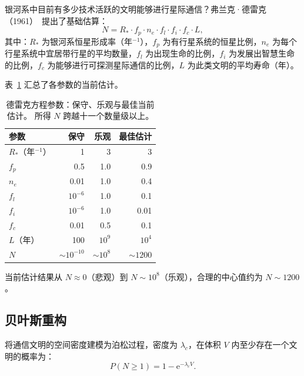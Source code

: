\documentclass[12pt,a4paper]{article}
\newcommand{\ee}{\mathrm{e}}
\begin{document}
银河系中目前有多少技术活跃的文明能够进行星际通信？弗兰克·德雷克（1961）~\citep{Drake1961}提出了基础估算：
\begin{equation}
  \boxed{N = R_* \cdot f_p \cdot n_e \cdot f_l \cdot f_i \cdot f_c \cdot L,}
\end{equation}
其中：$R_*$ 为银河系恒星形成率（年$^{-1}$），$f_p$ 为有行星系统的恒星比例，$n_e$ 为每个行星系统中宜居带行星的平均数量，$f_l$ 为出现生命的比例，$f_i$ 为发展出智慧生命的比例，$f_c$ 为能够进行可探测星际通信的比例，$L$ 为此类文明的平均寿命（年）。

表~\ref{tab:drake_zh} 汇总了各参数的当前估计。

\begin{table}[ht]
  \centering
  \caption{德雷克方程参数：保守、乐观与最佳当前估计。
    所得 $N$ 跨越十一个数量级以上。}
  \label{tab:drake_zh}
  \begin{tabularx}{\textwidth}{X r r r}
    \toprule
    参数 & 保守 & 乐观 & 最佳估计 \\
    \midrule
    $R_*$（年$^{-1}$） & 1    & 3          & 3    \\
    $f_p$              & 0.5  & 1.0        & 0.9  \\
    $n_e$              & 0.01 & 1.0        & 0.4  \\
    $f_l$              & $10^{-6}$ & 1.0  & 0.1  \\
    $f_i$              & $10^{-6}$ & 1.0  & 0.01 \\
    $f_c$              & 0.01 & 0.5        & 0.1  \\
    $L$（年）          & 100  & $10^9$     & $10^4$ \\
    \midrule
    $N$       & $\sim 10^{-10}$ & $\sim 10^8$ & $\sim 1200$ \\
    \bottomrule
  \end{tabularx}
\end{table}

当前估计结果从 $N \approx 0$（悲观）到 $N \sim 10^8$（乐观），合理的中心值约为 $N \sim 1200$。

\subsection{贝叶斯重构}

将通信文明的空间密度建模为泊松过程，密度为 $\lambda_c$，在体积 $V$ 内至少存在一个文明的概率为：
\begin{equation}
  P(N \geq 1) = 1 - \ee^{-\lambda_c V}.
\end{equation}
\end{document}
